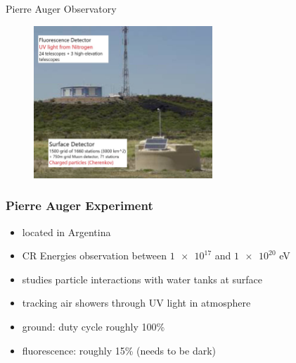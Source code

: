 \documentclass[aspectratio=1610, 9pt]{beamer}
\begin{document}
\begin{frame}{Pierre Auger Observatory}
  \begin{figure}
    \centering
    \includegraphics[width=0.6\textwidth]{auger_both.jpg}
  \end{figure}
\end{frame}

\begin{frame}\frametitle{Pierre Auger Experiment}
  \begin{itemize}
    \item located in Argentina
    \item CR Energies observation between $\num{1e17}$ and $\num{1e20}$ eV
    \item studies particle interactions with water tanks at surface
    \item tracking air showers through UV light in atmosphere
    \item ground: duty cycle roughly 100\%
    \item fluorescence: roughly 15\% (needs to be dark)
  \end{itemize}
\end{frame}


\end{document}
